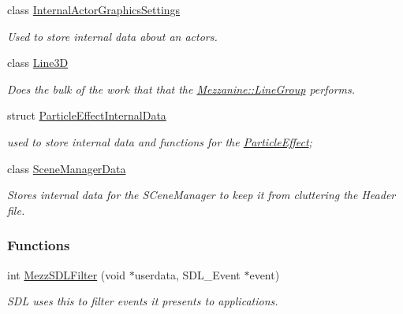 \begin{DoxyCompactItemize}
class \hyperlink{classMezzanine_1_1internal_1_1InternalActorGraphicsSettings}{InternalActorGraphicsSettings}
\begin{DoxyCompactList}\small\item\em Used to store internal data about an actors. \item\end{DoxyCompactList}\item 
class \hyperlink{classMezzanine_1_1internal_1_1Line3D}{Line3D}
\begin{DoxyCompactList}\small\item\em Does the bulk of the work that that the \hyperlink{classMezzanine_1_1LineGroup}{Mezzanine::LineGroup} performs. \item\end{DoxyCompactList}\item 
struct \hyperlink{structMezzanine_1_1internal_1_1ParticleEffectInternalData}{ParticleEffectInternalData}
\begin{DoxyCompactList}\small\item\em used to store internal data and functions for the \hyperlink{classMezzanine_1_1ParticleEffect}{ParticleEffect}; \item\end{DoxyCompactList}\item 
class \hyperlink{classMezzanine_1_1internal_1_1SceneManagerData}{SceneManagerData}
\begin{DoxyCompactList}\small\item\em Stores internal data for the SCeneManager to keep it from cluttering the Header file. \item\end{DoxyCompactList}\end{DoxyCompactItemize}
\subsubsection*{Functions}
\begin{DoxyCompactItemize}
\item 
int \hyperlink{namespaceMezzanine_1_1internal_af7f8357f11f4c0f6217cfce883184019}{MezzSDLFilter} (void $\ast$userdata, SDL\_\-Event $\ast$event)
\begin{DoxyCompactList}\small\item\em SDL uses this to filter events it presents to applications. \item\end{DoxyCompactList}\end{DoxyCompactItemize}


